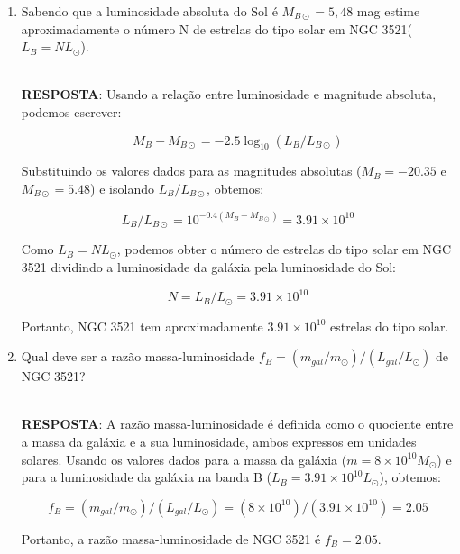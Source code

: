 \documentclass[a4paper,12pt]{article}
\begin{document}
\begin{enumerate}
\begin{enumerate}
\noindent\hrulefill

\item Sabendo que a luminosidade absoluta do Sol é $M_{B\odot} =5,48$ mag estime aproximadamente o número N de estrelas do tipo solar em NGC 3521($L_B=N L_\odot$).
    
\noindent\hrulefill\\\textbf{RESPOSTA}: Usando a relação entre luminosidade e magnitude absoluta, podemos escrever:

\begin{equation*}
M_B - M_{B\odot} = -2.5\log_{10}(L_B/L_{B\odot})
\end{equation*}

Substituindo os valores dados para as magnitudes absolutas ($M_B=-20.35$ e $M_{B\odot}=5.48$) e isolando $L_B/L_{B\odot}$, obtemos:

\begin{equation*}
L_B/L_{B\odot} = 10^{-0.4(M_B - M_{B\odot})} = 3.91\times 10^{10}
\end{equation*}

Como $L_B=N L_\odot$, podemos obter o número de estrelas do tipo solar em NGC 3521 dividindo a luminosidade da galáxia pela luminosidade do Sol:

\begin{equation*}
N = L_B/L_\odot = 3.91\times 10^{10}
\end{equation*}

Portanto, NGC 3521 tem aproximadamente $3.91\times 10^{10}$ estrelas do tipo solar.

\noindent\hrulefill

\item Qual deve ser a razão massa-luminosidade $f_B = (m_{gal}/m_\odot)/(L_{gal}/L_\odot )$ de NGC 3521?
    
\noindent\hrulefill\\\textbf{RESPOSTA}: A razão massa-luminosidade é definida como o quociente entre a massa da galáxia e a sua luminosidade, ambos expressos em unidades solares. Usando os valores dados para a massa da galáxia ($m=8\times 10^{10} M_\odot$) e para a luminosidade da galáxia na banda B ($L_B=3.91\times 10^{10} L_\odot$), obtemos:

\begin{equation*}
f_B = (m_{gal}/m_\odot)/(L_{gal}/L_\odot ) = (8\times 10^{10})/(3.91\times 10^{10}) = 2.05
\end{equation*}

Portanto, a razão massa-luminosidade de NGC 3521 é $f_B=2.05$.


\end{enumerate}
\end{enumerate}
\end{document}
